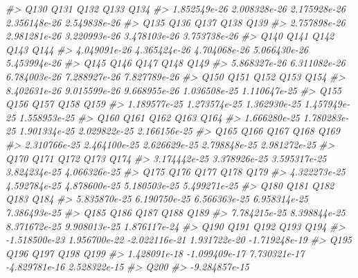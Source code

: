 \documentclass[]{article}
\newenvironment{Shaded}{\begin{snugshade}}{\end{snugshade}}
\newcommand{\CommentTok}[1]{\textcolor[rgb]{0.56,0.35,0.01}{\textit{#1}}}
\begin{document}
\begin{Shaded}
\begin{Highlighting}[]
\CommentTok{#>          Q130          Q131          Q132          Q133          Q134 }
\CommentTok{#>  1.852549e-26  2.008328e-26  2.175928e-26  2.356148e-26  2.549838e-26 }
\CommentTok{#>          Q135          Q136          Q137          Q138          Q139 }
\CommentTok{#>  2.757898e-26  2.981281e-26  3.220993e-26  3.478103e-26  3.753738e-26 }
\CommentTok{#>          Q140          Q141          Q142          Q143          Q144 }
\CommentTok{#>  4.049091e-26  4.365424e-26  4.704068e-26  5.066430e-26  5.453994e-26 }
\CommentTok{#>          Q145          Q146          Q147          Q148          Q149 }
\CommentTok{#>  5.868327e-26  6.311082e-26  6.784003e-26  7.288927e-26  7.827789e-26 }
\CommentTok{#>          Q150          Q151          Q152          Q153          Q154 }
\CommentTok{#>  8.402631e-26  9.015599e-26  9.668955e-26  1.036508e-25  1.110647e-25 }
\CommentTok{#>          Q155          Q156          Q157          Q158          Q159 }
\CommentTok{#>  1.189577e-25  1.273574e-25  1.362930e-25  1.457949e-25  1.558953e-25 }
\CommentTok{#>          Q160          Q161          Q162          Q163          Q164 }
\CommentTok{#>  1.666280e-25  1.780283e-25  1.901334e-25  2.029822e-25  2.166156e-25 }
\CommentTok{#>          Q165          Q166          Q167          Q168          Q169 }
\CommentTok{#>  2.310766e-25  2.464100e-25  2.626629e-25  2.798848e-25  2.981272e-25 }
\CommentTok{#>          Q170          Q171          Q172          Q173          Q174 }
\CommentTok{#>  3.174442e-25  3.378926e-25  3.595317e-25  3.824234e-25  4.066326e-25 }
\CommentTok{#>          Q175          Q176          Q177          Q178          Q179 }
\CommentTok{#>  4.322273e-25  4.592784e-25  4.878600e-25  5.180503e-25  5.499271e-25 }
\CommentTok{#>          Q180          Q181          Q182          Q183          Q184 }
\CommentTok{#>  5.835870e-25  6.190750e-25  6.566363e-25  6.958314e-25  7.386493e-25 }
\CommentTok{#>          Q185          Q186          Q187          Q188          Q189 }
\CommentTok{#>  7.784215e-25  8.398844e-25  8.371672e-25  9.908013e-25  1.876117e-24 }
\CommentTok{#>          Q190          Q191          Q192          Q193          Q194 }
\CommentTok{#> -1.518500e-23  1.956700e-22 -2.022116e-21  1.931722e-20 -1.719248e-19 }
\CommentTok{#>          Q195          Q196          Q197          Q198          Q199 }
\CommentTok{#>  1.428091e-18 -1.099409e-17  7.730321e-17 -4.829781e-16  2.528322e-15 }
\CommentTok{#>          Q200 }
\CommentTok{#> -9.284857e-15}
\end{Highlighting}
\end{Shaded}
\end{document}
